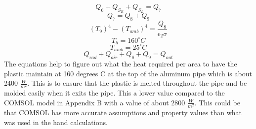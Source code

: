 \documentclass[11pt,english]{article}
\begin{document}
\begin{equation}\label{twentyeight}
Q_{6}+Q_{S_R}+Q_{S_L}=Q_{7}
\end{equation}
\begin{equation}\label{twentynine}
Q_{7}=Q_{8}+Q_{9}
\end{equation}
\begin{equation}\label{thirty}
(T_9)^4-(T_{amb})^4=\frac{Q_8}{\epsilon_2 \sigma}
\end{equation}
\begin{equation}\label{thirtyone}
T_5=160^{\circ} C
\end{equation}
\begin{equation}\label{thirtytwo}
T_{amb}=25^{\circ} C
\end{equation}
\begin{equation}\label{thirtythree}
Q_{rad}+Q_{air}+Q_{8}+Q_9=Q_{out}
\end{equation}
The equations help to figure out what the heat required per area to have the plastic maintain at 160 degrees C at the top of the aluminum pipe which is about 2400 $\frac{W}{m^2}$.  This is to ensure that the plastic is melted throughout the pipe and be molded easily when it exits the pipe. This a lower value compared to the COMSOL model in Appendix B with a value of about 2800 $\frac{W}{m^2}$.  This could be that COMSOL has more accurate assumptions and property values than what was used in the hand calculations.
\end{document}
